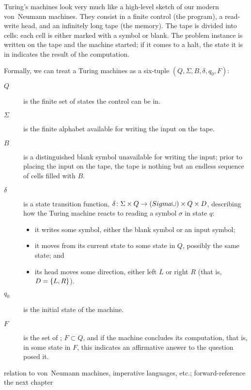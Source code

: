 Turing's machines look very much like a high-level sketch of our modern von~Neumann machines. They consist in a finite control (the program), a read-write head, and an infinitely long tape (the memory). The tape is divided into cells: each cell is either marked with a symbol or blank. The problem instance is written on the tape and the machine started; if it comes to a halt, the state it is in indicates the result of the computation.

Formally, we can treat a Turing machines as a six-tuple $(Q, \Sigma, B, \delta, q_{0}, F)$:
\begin{description} %
\item[\MakeUppercase{$Q$}] is the finite set of states the control can be in.
\item[$\Sigma$] is the finite alphabet available for writing the input on the tape.
\item[\MakeUppercase{$B$}] is a distinguished blank symbol unavailable for writing the input; prior to placing the input on the tape, the tape is nothing but an endless sequence of cells filled with $B$.
\item[$\delta$] is a state transition function, $\delta\from \Sigma \times Q \to (Sigma \union B) \times Q \times D$, describing how the Turing machine reacts to reading a symbol $\sigma$ in state $q$: 
\begin{itemize}
\item it writes some symbol, either the blank symbol or an input symbol; 
\item it moves from its current state to some state in $Q$, possibly the same state; and
\item its head moves some direction, either left $L$ or right $R$ (that is, $D = \set{L, R}$).
\end{itemize}
\item[$q_{0}$] is the initial state of the machine.
\item[\MakeUppercase{$F$}] is the set of ; $F \subset Q$, and if the machine concludes its computation, that is,  in some state in $F$, this indicates an affirmative answer to the question posed it.
\end{description}

relation to von~Neumann machines, imperative languages, etc.; forward-reference the next chapter
